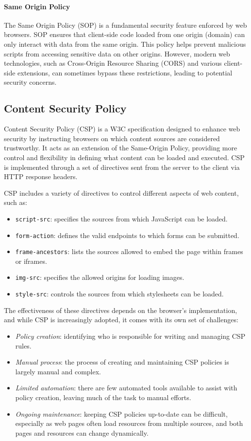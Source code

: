 \paragraph*{Same Origin Policy}
The Same Origin Policy (SOP) is a fundamental security feature enforced by web browsers. 
SOP ensures that client-side code loaded from one origin (domain) can only interact with data from the same origin. 
This policy helps prevent malicious scripts from accessing sensitive data on other origins. 
However, modern web technologies, such as Cross-Origin Resource Sharing (CORS) and various client-side extensions, can sometimes bypass these restrictions, leading to potential security concerns.

\subsection{Content Security Policy}
Content Security Policy (CSP) is a W3C specification designed to enhance web security by instructing browsers on which content sources are considered trustworthy. 
It acts as an extension of the Same-Origin Policy, providing more control and flexibility in defining what content can be loaded and executed. 
CSP is implemented through a set of directives sent from the server to the client via HTTP response headers.

CSP includes a variety of directives to control different aspects of web content, such as:
\begin{itemize}
    \item \texttt{script-src}: specifies the sources from which JavaScript can be loaded.
    \item \texttt{form-action}: defines the valid endpoints to which forms can be submitted.
    \item \texttt{frame-ancestors}: lists the sources allowed to embed the page within frames or iframes.
    \item \texttt{img-src}: specifies the allowed origins for loading images.
    \item \texttt{style-src}: controls the sources from which stylesheets can be loaded.
\end{itemize}
The effectiveness of these directives depends on the browser's implementation, and while CSP is increasingly adopted, it comes with its own set of challenges:
\begin{itemize}
    \item \textit{Policy creation}: identifying who is responsible for writing and managing CSP rules.
    \item \textit{Manual process}: the process of creating and maintaining CSP policies is largely manual and complex.
    \item \textit{Limited automation}: there are few automated tools available to assist with policy creation, leaving much of the task to manual efforts.
    \item \textit{Ongoing maintenance}: keeping CSP policies up-to-date can be difficult, especially as web pages often load resources from multiple sources, and both pages and resources can change dynamically.
\end{itemize}
